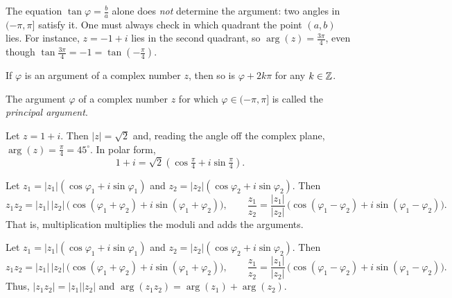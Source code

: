\begin{warning}
The equation $\tan\varphi= \tfrac{b}{a}$ alone does \emph{not} determine the argument: two angles in
$(-\pi,\pi]$ satisfy it. One must always check in which quadrant the point $(a,b)$ lies. For instance,
$z=-1+i$ lies in the second quadrant, so $\arg(z)=\tfrac{3\pi}{4}$, even though
$\tan \tfrac{3\pi}{4} = -1 = \tan\!\left(-\tfrac{\pi}{4}\right)$.
\end{warning}

\begin{fact}
If $\varphi$ is an argument of a complex number $z$, then so is $\varphi+2k\pi$ for any $k\in\mathbb{Z}$.
\end{fact}

\begin{definition}
The argument $\varphi$ of a complex number $z$ for which $\varphi\in (-\pi,\pi]$ is called the
\emph{principal argument}.
\end{definition}

\begin{example}
Let $z=1+i$. Then $|z|=\sqrt{2}$ and, reading the angle off the complex plane, $\arg(z) = \tfrac{\pi}{4}=45^\circ$.
In polar form,
\[
1+i = \sqrt{2}\left( \cos\tfrac{\pi}{4} + i \sin \tfrac{\pi}{4}\right).
\]
\end{example}

\begin{theorem}
Let $z_1=|z_1|(\cos \varphi_1 + i\sin\varphi_1)$ and $z_2=|z_2|(\cos \varphi_2 + i\sin\varphi_2)$. Then
\[
z_1 z_2 = |z_1|\,|z_2|\,\big(\cos (\varphi_1+\varphi_2) + i\sin(\varphi_1+\varphi_2)\big), \qquad
\frac{z_1}{z_2} = \frac{|z_1|}{|z_2|}\,\big(\cos (\varphi_1-\varphi_2) + i\sin(\varphi_1-\varphi_2)\big).
\]
That is, multiplication multiplies the moduli and adds the arguments.
\end{theorem}

\begin{theorem}
Let $z_1=|z_1|(\cos \varphi_1 + i\sin\varphi_1)$ and $z_2=|z_2|(\cos \varphi_2 + i\sin\varphi_2)$. Then
\[
z_1 z_2 = |z_1|\,|z_2|\,\big(\cos (\varphi_1+\varphi_2) + i\sin(\varphi_1+\varphi_2)\big), \qquad
\frac{z_1}{z_2} = \frac{|z_1|}{|z_2|}\,\big(\cos (\varphi_1-\varphi_2) + i\sin(\varphi_1-\varphi_2)\big).
\]
Thus, $|z_1 z_2| = |z_1||z_2|$ and $\arg(z_1 z_2) = \arg(z_1) + \arg(z_2)$.
\end{theorem}

